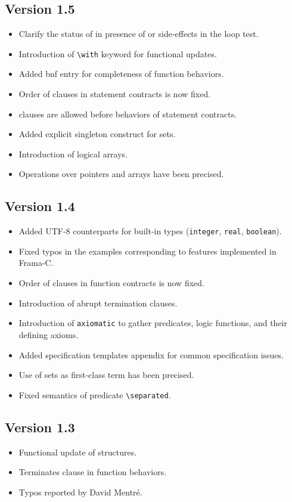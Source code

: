 \documentclass[a4paper,web]{frama-c-book}
\begin{document}
\subsection{Version 1.5}

\begin{itemize}
\item Clarify the status of \Loop \invariant in presence of
  \Break or side-effects in the loop test.
\item Introduction of \lstinline|\with| keyword for functional updates.
\item Added bnf entry for completeness of function behaviors.
\item Order of clauses in statement contracts is now fixed.
\item \requires clauses are allowed before behaviors of statement contracts.
\item Added explicit singleton construct for sets.
\item Introduction of logical arrays.
\item Operations over pointers and arrays have been precised.
\end{itemize}

\subsection{Version 1.4}
\begin{itemize}
\item Added UTF-8 counterparts for built-in types
  (\lstinline|integer|, \lstinline|real|, \lstinline|boolean|).
\item Fixed typos in the examples corresponding to features
  implemented in Frama-C.
\item Order of clauses in function contracts is now fixed.
\item Introduction of abrupt termination clauses.
\item Introduction of \lstinline|axiomatic| to gather predicates, logic
  functions, and their defining axioms.
\item Added specification templates appendix for common specification issues.
\item Use of sets as first-class term has been precised.
\item Fixed semantics of predicate \lstinline|\separated|.
\end{itemize}

\subsection{Version 1.3}
\begin{itemize}
\item Functional update of structures.
\item Terminates clause in function behaviors.
\item Typos reported by David Mentr\'e.
\end{itemize}
\end{document}
